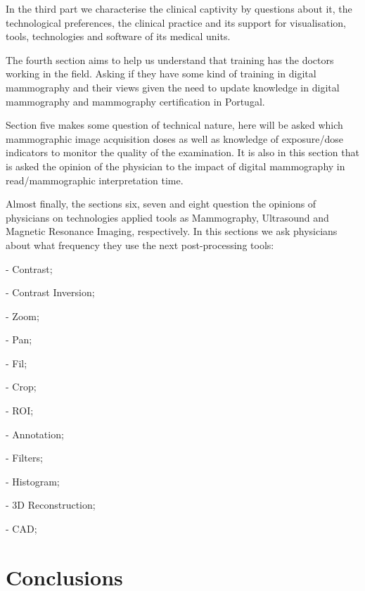In the third part we characterise the clinical captivity by questions about it, the technological preferences, the clinical practice and its support for visualisation, tools, technologies and software of its medical units.

The fourth section aims to help us understand that training has the doctors working in the field. Asking if they have some kind of training in digital mammography and their views given the need to update knowledge in digital mammography and mammography certification in Portugal.

Section five makes some question of technical nature, here will be asked which mammographic image acquisition doses as well as knowledge of exposure/dose indicators to monitor the quality of the examination. It is also in this section that is asked the opinion of the physician to the impact of digital mammography in read/mammographic interpretation time.

\clearpage

Almost finally, the sections six, seven and eight question the opinions of physicians on technologies applied tools as Mammography, Ultrasound and Magnetic Resonance Imaging, respectively. In this sections we ask physicians about what frequency they use the next post-processing tools:

- Contrast;

- Contrast Inversion;

- Zoom;

- Pan;

- Fil;

- Crop;

- ROI;

- Annotation;

- Filters;

- Histogram;

- 3D Reconstruction;

- CAD;

\clearpage

\section{Conclusions}



\clearpage

\begin{thebibliography}{}
\bibitem{}
\end{thebibliography}





